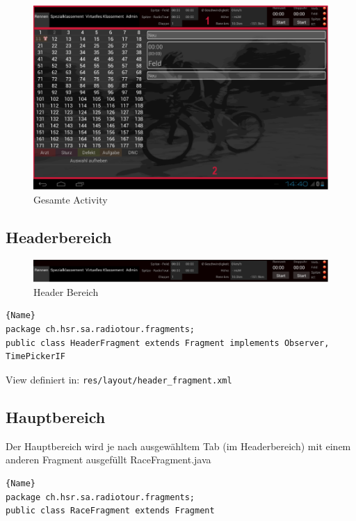 \begin{figure}[h!]
\caption{Gesamte Activity}
\centering
\includegraphics[scale=0.9]{07anhang/images/dev_activity.png}
\end{figure}

\subsection{Headerbereich}

\begin{figure}[h!]
\caption{Header Bereich}
\centering
\includegraphics[scale=0.9]{07anhang/images/dev_header.png}
\end{figure}


\begin{lstlisting}{Name}
package ch.hsr.sa.radiotour.fragments;
public class HeaderFragment extends Fragment implements Observer, TimePickerIF
\end{lstlisting}

View definiert in:
\lstinline|res/layout/header_fragment.xml|

\subsection{Hauptbereich}
Der Hauptbereich wird je nach ausgewähltem Tab (im Headerbereich) mit einem anderen Fragment ausgefüllt
RaceFragment.java

\begin{lstlisting}{Name}
package ch.hsr.sa.radiotour.fragments;
public class RaceFragment extends Fragment 
\end{lstlisting}


